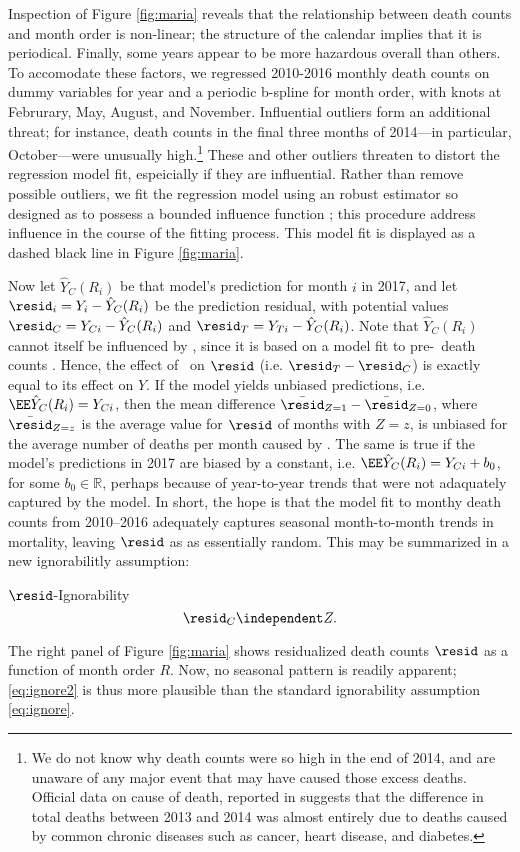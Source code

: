 Inspection of Figure \ref{fig:maria} reveals that the relationship
between death counts and month order is non-linear; the structure of
the calendar implies that it is periodical.
Finally, some years appear to be more hazardous overall than others.
To accomodate these factors, we regressed 2010-2016 monthly death counts
on dummy variables for year and a periodic b-spline for month order,
with knots at Februrary, May, August, and November.
Influential outliers form an additional threat; for instance, death
counts in the final three months of 2014---in particular,
October---were unusually high.\footnote{We do not know why death
  counts were so high in the end of 2014, and are unaware of any
  major event that may have caused those excess deaths. Official data
  on cause of death, reported in \citet[][p. 44]{PRsalud} suggests
  that the difference in total deaths between 2013 and 2014 was almost
  entirely due to deaths caused by common chronic diseases such as
  cancer, heart disease, and diabetes.}
These and other outliers threaten to distort the regression model
fit, espeicially if they are influential.
Rather than remove possible outliers, we fit the regression model
using an robust estimator so designed as to possess a bounded influence function
 \citep{yohaiZamar1997locallyrobustMestimates}; this procedure address influence
 in the course of the fitting process.
This model fit is displayed as a dashed black line in Figure
\ref{fig:maria}.

Now let $\hat{Y}_C(R_i)$ be that model's prediction for month $i$ in
2017, and let $\resid_i=Y_i-\hat{Y}_C(R_i)$ be the prediction residual,
with potential values $\resid_C=Y_{Ci}-\hat{Y}_C(R_i)$ and $\resid_T=Y_{Ti}-\hat{Y}_C(R_i)$.
Note that $\hat{Y}_C(R_i)$ cannot itself be influenced by \maria,
since it is based on a model fit to pre-\maria\ death counts \citep[c.f.][]{rebarPaper}.
Hence, the effect of \maria\ on $\resid$ (i.e. $\resid_T-\resid_C$) is exactly equal to its effect on $Y$.
If the model yields unbiased predictions, i.e. $\EE
\hat{Y}_C(R_i)=Y_{Ci}$, then the mean difference
$\bar{\resid}_{Z=1}-\bar{\resid}_{Z=0}$, where $\bar{\resid}_{Z=z}$ is the average
value for $\resid$ of months with $Z=z$, is unbiased for the average number
of deaths per month caused by \maria.
The same is true if the model's predictions in 2017 are biased by a constant,
i.e. $\EE \hat{Y}_C(R_i)=Y_{Ci}+b_0$, for some $b_0\in\mathbb{R}$,
perhaps because of year-to-year trends that were not adaquately
captured by the model.
In short, the hope is that the model fit to monthy death counts from
2010--2016 adequately captures seasonal month-to-month trends in
mortality, leaving $\resid$ as as essentially random.
This may be summarized in a new ignorabilitly assumption:
\begin{ass}{$\resid$-Ignorability}
\begin{equation}\label{eq:ignore2}
\resid_{C} \independent Z.
\end{equation}
\end{ass}
The right panel of Figure \ref{fig:maria} shows residualized death counts $\resid$ as a
function of month order $R$.
Now, no seasonal pattern is readily apparent; \eqref{eq:ignore2} is
thus more plausible than the standard ignorability assumption \eqref{eq:ignore}.

